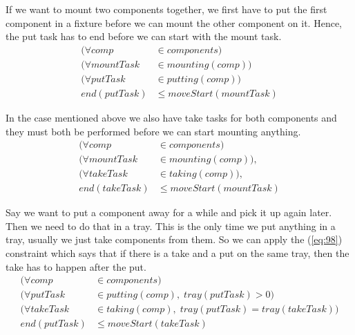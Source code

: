   \noindent If we want to mount two components together, we first have to put the first component in a fixture before we can mount the other component on it. Hence, the put task has to end before we can start with the mount task. 
 \begin{equation}
 \begin{aligned}\label{eq:96}
 (\forall comp &\in components) \\
 (\forall mountTask &\in mounting(comp)) \\
 (\forall putTask &\in putting(comp)) \\
 end(putTask) &\le moveStart(mountTask)
 \end{aligned}
 \end{equation}

  \noindent In the case mentioned above we also have take tasks for both components and they must both be performed before we can start mounting anything.
 \begin{equation}
 \begin{aligned}\label{eq:97}
 (\forall comp &\in components) \\
 (\forall mountTask &\in mounting(comp)), \\
 (\forall takeTask &\in taking(comp)), \\
 end(takeTask) &\le moveStart(mountTask)
 \end{aligned}
 \end{equation}

  \noindent Say we want to put a component away for a while and pick it up again later. Then we need to do that in a tray. This is the only time we put anything in a tray, usually we just take components from them. So we can apply the (\ref{eq:98}) constraint which says that if there is a take and a put on the same tray, then the take has to happen after the put. 
 \begin{equation}
 \begin{aligned}\label{eq:98}
 (\forall comp &\in components) \\
 (\forall putTask &\in putting(comp), \; tray(putTask) > 0)\\
 (\forall takeTask &\in taking(comp), \; tray(putTask) = tray(takeTask))\\
 end(putTask) &\le moveStart(takeTask)
 \end{aligned}
 \end{equation}

